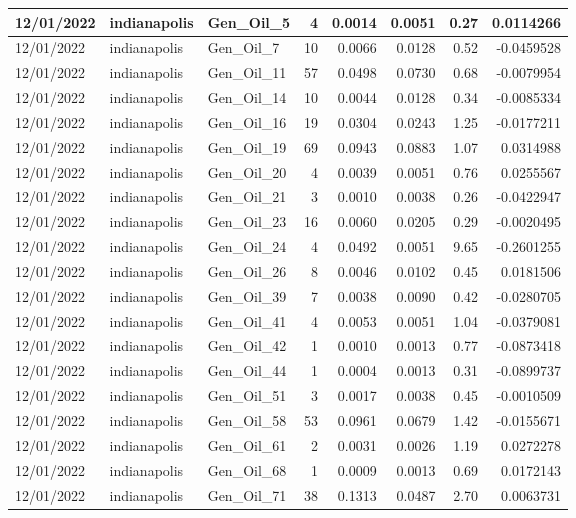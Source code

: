 \documentclass[
  letterpaper,
  DIV=11,
  numbers=noendperiod]{scrartcl}
\begin{document}
\begin{tabular}{l|l|l|r|r|r|r|r}
\hline
12/01/2022 & indianapolis & Gen\_Oil\_5 & 4 & 0.0014 & 0.0051 & 0.27 & 0.0114266\\
\hline
12/01/2022 & indianapolis & Gen\_Oil\_7 & 10 & 0.0066 & 0.0128 & 0.52 & -0.0459528\\
\hline
12/01/2022 & indianapolis & Gen\_Oil\_11 & 57 & 0.0498 & 0.0730 & 0.68 & -0.0079954\\
\hline
12/01/2022 & indianapolis & Gen\_Oil\_14 & 10 & 0.0044 & 0.0128 & 0.34 & -0.0085334\\
\hline
12/01/2022 & indianapolis & Gen\_Oil\_16 & 19 & 0.0304 & 0.0243 & 1.25 & -0.0177211\\
\hline
12/01/2022 & indianapolis & Gen\_Oil\_19 & 69 & 0.0943 & 0.0883 & 1.07 & 0.0314988\\
\hline
12/01/2022 & indianapolis & Gen\_Oil\_20 & 4 & 0.0039 & 0.0051 & 0.76 & 0.0255567\\
\hline
12/01/2022 & indianapolis & Gen\_Oil\_21 & 3 & 0.0010 & 0.0038 & 0.26 & -0.0422947\\
\hline
12/01/2022 & indianapolis & Gen\_Oil\_23 & 16 & 0.0060 & 0.0205 & 0.29 & -0.0020495\\
\hline
12/01/2022 & indianapolis & Gen\_Oil\_24 & 4 & 0.0492 & 0.0051 & 9.65 & -0.2601255\\
\hline
12/01/2022 & indianapolis & Gen\_Oil\_26 & 8 & 0.0046 & 0.0102 & 0.45 & 0.0181506\\
\hline
12/01/2022 & indianapolis & Gen\_Oil\_39 & 7 & 0.0038 & 0.0090 & 0.42 & -0.0280705\\
\hline
12/01/2022 & indianapolis & Gen\_Oil\_41 & 4 & 0.0053 & 0.0051 & 1.04 & -0.0379081\\
\hline
12/01/2022 & indianapolis & Gen\_Oil\_42 & 1 & 0.0010 & 0.0013 & 0.77 & -0.0873418\\
\hline
12/01/2022 & indianapolis & Gen\_Oil\_44 & 1 & 0.0004 & 0.0013 & 0.31 & -0.0899737\\
\hline
12/01/2022 & indianapolis & Gen\_Oil\_51 & 3 & 0.0017 & 0.0038 & 0.45 & -0.0010509\\
\hline
12/01/2022 & indianapolis & Gen\_Oil\_58 & 53 & 0.0961 & 0.0679 & 1.42 & -0.0155671\\
\hline
12/01/2022 & indianapolis & Gen\_Oil\_61 & 2 & 0.0031 & 0.0026 & 1.19 & 0.0272278\\
\hline
12/01/2022 & indianapolis & Gen\_Oil\_68 & 1 & 0.0009 & 0.0013 & 0.69 & 0.0172143\\
\hline
12/01/2022 & indianapolis & Gen\_Oil\_71 & 38 & 0.1313 & 0.0487 & 2.70 & 0.0063731\\

\end{tabular}
\end{document}
